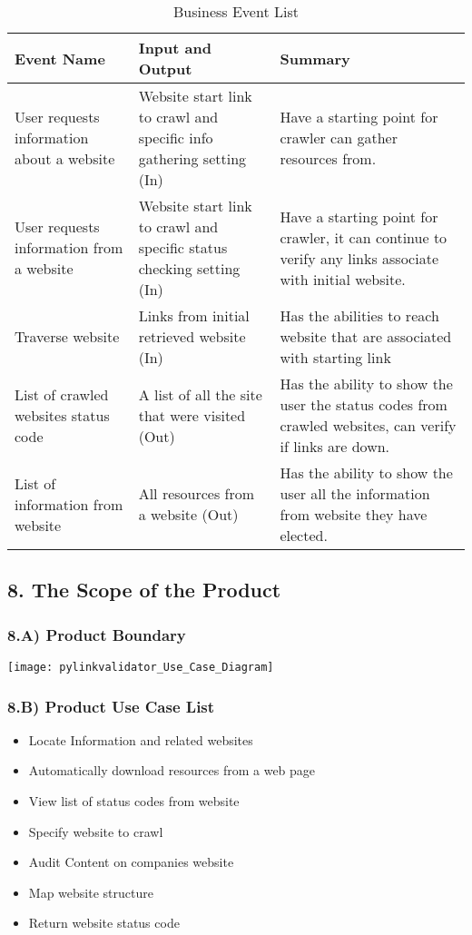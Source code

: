 \documentclass[12pt]{article}
\begin{document}
\begin{table}[h!]
    \begin{tabular}{| p{5cm} | p{5cm} | p{5cm} |}    \hline
    Event Name &	Input and Output	 & Summary\\ \hline
    User requests information about a website	& Website start link to crawl and specific info gathering setting (In)	& Have a starting point for crawler can gather resources from. \\ \hline
    User requests information from a website	 & Website start link to crawl and specific status checking setting (In)	& Have a starting point for crawler, it can continue to verify any links associate with initial website.\\ \hline
    Traverse website	& Links from initial retrieved website (In)	& Has the abilities to reach website that are associated with starting link \\ \hline
    
    List of crawled websites status code & 	A list of all the site that were visited (Out)	& Has the ability to show the user the status codes from crawled websites, can verify if links are down. \\ \hline
     
      List of information from website	& All resources from a website (Out)	& Has the ability to show the user all the information from website they have elected. \\ \hline
      
    \end{tabular}
    \caption{Business Event List}
\label{table:Business Event List}
\end{table}


\subsection{8. The Scope of the Product}
\subsubsection{8.A) Product Boundary}
\texttt{[image: pylinkvalidator\_Use\_Case\_Diagram]}
\subsubsection{8.B) Product Use Case List  }
\begin{itemize}
  \item Locate Information and related websites
  \item Automatically download resources from a web page
  \item View list of status codes from website 
  \item Specify website to crawl
  \item Audit Content on companies website 
  \item Map website structure
  \item Return website status code
\end{itemize}
\end{document}
